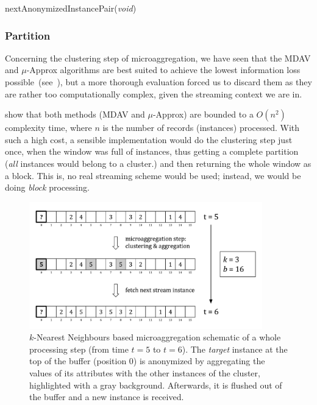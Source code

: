\begin{procedure}[H]
\caption{nextAnonymizedInstancePair(\textit{void})\label{al:buffered-procedure}}
\end{procedure}

\subsubsection{Partition}

Concerning the clustering step of microaggregation, we have seen that the MDAV and $\mu$-Approx algorithms are best suited to achieve the lowest information loss possible~(see~), but a more thorough evaluation forced us to discard them as they are rather too computationally complex, given the streaming context we are in.

\citet{Domingo:MuAproxPolyTimeMicroagg} show that both methods (MDAV and $\mu$-Approx) are bounded to a $O(n^2)$ complexity time, where $n$ is the number of records (instances) processed. With such a high cost, a sensible implementation would do the clustering step just once, when the window was full of instances, thus getting a complete partition (\textit{all} instances would belong to a cluster.) and then returning the whole window as a block. This is, no real streaming scheme would be used; instead, we would be doing \textit{block} processing.

\begin{figure}[h]
	\centering
	\includegraphics[width=0.9\textwidth]{figures/microaggregation-schematic-1.pdf}
	\caption[Streaming KNN-based microaggregation.]{$k$-Nearest Neighbours based microaggregation schematic of a whole processing step (from time $t=5$ to $t=6$). The \textit{target} instance at the top of the buffer (position 0) is anonymized by aggregating the values of its attributes with the other instances of the cluster, highlighted with a gray background. Afterwards, it is flushed out of the buffer and a new instance is received.}
	\label{fig:microaggregation-schematic-1}
\end{figure}


